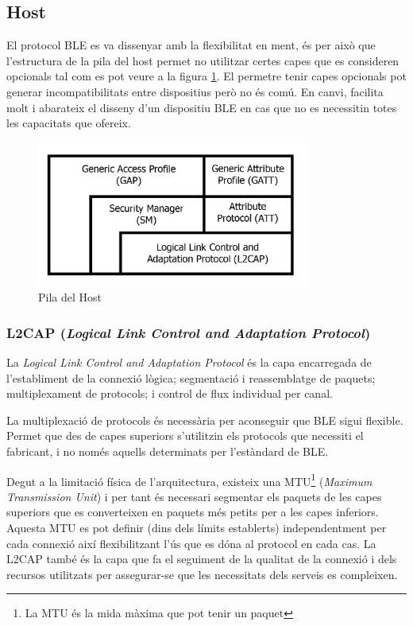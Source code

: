 \subsection{Host}
El protocol BLE es va dissenyar amb la flexibilitat en ment, és per això que l'estructura de la pila del host permet no utilitzar certes capes que es consideren opcionals tal com es pot veure a la figura \ref{host_stack}.
El permetre tenir capes opcionals pot generar incompatibilitats entre dispositius però no és comú.
En canvi, facilita molt i abarateix el disseny d'un dispositiu BLE en cas que no es necessitin totes les capacitats que ofereix.

\begin{figure}[h!]
	\begin{center}
		\includegraphics[width=0.8\textwidth]{./images/ble_host_stack.png}
		\caption{Pila del Host \cite{ble_stack}}
			\label{host_stack}
	\end{center}
\end{figure}

\subsubsection{L2CAP (\textit{Logical Link Control and Adaptation Protocol})}
La \textit{Logical Link Control and Adaptation Protocol} és la capa encarregada de l'establiment de la connexió lògica; segmentació i reassemblatge de paquets; multiplexament de protocols;  i control de flux individual per canal.

La multiplexació de protocols és necessària per aconseguir que BLE sigui flexible.
Permet que des de capes superiors s'utilitzin els protocols que necessiti el fabricant, i no només aquells determinats per l'estàndard de BLE.

Degut a la limitació física de l'arquitectura, existeix una MTU\footnote{La MTU és la mida màxima que pot tenir un paquet} (\textit{Maximum Transmission Unit}) i per tant és necessari segmentar els paquets de les capes superiors que es converteixen en paquets més petits per a les capes inferiors.
Aquesta MTU es pot definir (dins dels límits establerts) independentment per cada connexió així flexibilitzant l'ús que es dóna al protocol en cada cas.
La L2CAP també és la capa que fa el seguiment de la qualitat de la connexió i dels recursos utilitzats per assegurar-se que les necessitats dels serveis es compleixen.

